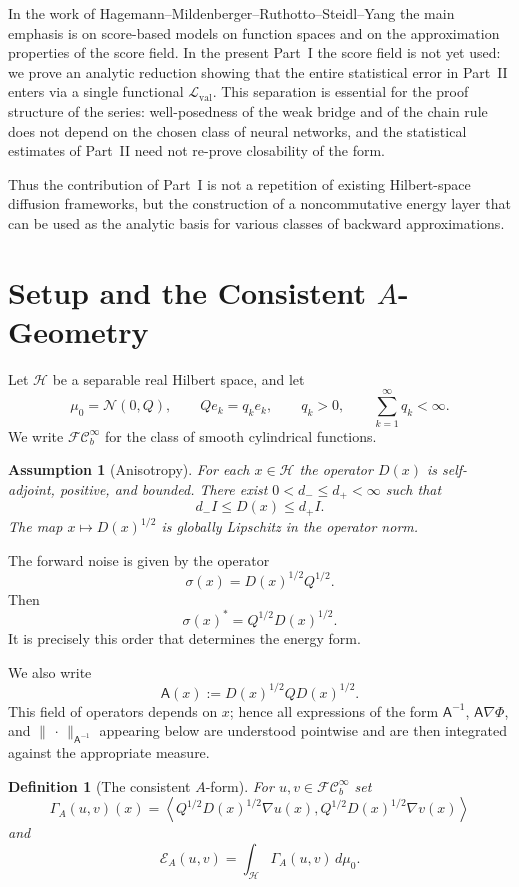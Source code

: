 \documentclass{article}
\newtheorem{assumption}[theorem]{Assumption}
\newtheorem{definition}[theorem]{Definition}
\newcommand{\Hh}{\mathcal H}
\newcommand{\Eval}{\mathcal L_{\mathrm{val}}}
\newcommand{\Asf}{\mathsf A}
\newcommand{\FC}{\mathcal{FC}_b^\infty}
\begin{document}
In the work of Hagemann--Mildenberger--Ruthotto--Steidl--Yang
\cite{Hagemann2025} the main emphasis is on score-based models on function
spaces and on the approximation properties of the score field. In the present
Part~I the score field is not yet used: we prove an analytic reduction showing
that the entire statistical error in Part~II enters via a single
functional \(\Eval\). This separation is essential for the proof structure of
the series: well-posedness of the weak bridge and of the chain rule does not
depend on the chosen class of neural networks, and the statistical estimates
of Part~II need not re-prove closability of the form.

Thus the contribution of Part~I is not a repetition of existing Hilbert-space
diffusion frameworks, but the construction of a noncommutative energy layer
that can be used as the analytic basis for various classes of backward
approximations.

\section{Setup and the Consistent \(A\)-Geometry}

Let \(\Hh\) be a separable real Hilbert space, and let
\[
        \mu_0=\mathcal N(0,Q),\qquad
        Qe_k=q_ke_k,\qquad q_k>0,\qquad \sum_{k=1}^\infty q_k<\infty .
\]
We write \(\FC\) for the class of smooth cylindrical functions.

\begin{assumption}[Anisotropy]
\label{ass:A1}
For each \(x\in\Hh\) the operator \(D(x)\) is self-adjoint, positive, and
bounded. There exist \(0<d_-\le d_+<\infty\) such that
\[
        d_-I\le D(x)\le d_+I .
\]
The map \(x\mapsto D(x)^{1/2}\) is globally Lipschitz in the operator norm.
\end{assumption}

The forward noise is given by the operator
\[
        \sigma(x)=D(x)^{1/2}Q^{1/2}.
\]
Then
\[
        \sigma(x)^*=Q^{1/2}D(x)^{1/2}.
\]
It is precisely this order that determines the energy form.

We also write
\[
        \Asf(x):=D(x)^{1/2}QD(x)^{1/2}.
\]
This field of operators depends on \(x\); hence all expressions of the form
\(\Asf^{-1}\), \(\Asf\nabla\Phi\), and \(\|\,\cdot\,\|_{\Asf^{-1}}\)
appearing below are understood pointwise and are then integrated against the
appropriate measure.


\begin{definition}[The consistent \(A\)-form]
For \(u,v\in\FC\) set
\[
        \Gamma_A(u,v)(x)=
        \left\langle Q^{1/2}D(x)^{1/2}\nabla u(x),
        Q^{1/2}D(x)^{1/2}\nabla v(x)\right\rangle
\]
and
\[
        \mathcal E_A(u,v)=\int_{\Hh}\Gamma_A(u,v)\,d\mu_0 .
\]
\end{definition}
\end{document}
